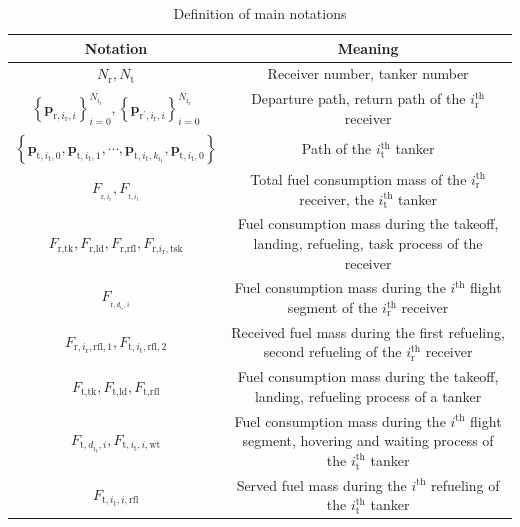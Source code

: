 \begin{table}
	\caption{Definition of main notations}
	
	\begin{centering}
		\begin{tabular}{|c|c|}
			\hline 
			Notation & Meaning\tabularnewline
			\hline 
			${N_\text{r}},{N_\text{t}}$ & Receiver number, tanker number\tabularnewline
			
			$\left\{\mathbf{p}_{\text{r},i_\text{r},i}\right\}_{i=0}^{N_{i_\text{r}}},\left\{\mathbf{p}_{\text{r}^{\prime},i_\text{r},i}\right\}_{i=0}^{N_{i_\text{r}}}$ & Departure path, return path of the $i_{\text{r}}^{\text{th}}$ receiver\tabularnewline
			
			$\left\{\mathbf{p}_{\text{t},i_{\text{t}},0},\mathbf{p}_{\text{t},i_{\text{t}},1},\cdots,\mathbf{p}_{\text{t},i_{\text{t}},k_{i_\text{t}}},\mathbf{p}_{\text{t},i_{\text{t}},0}\right\}$& Path of the $i_{\text{t}}^{\text{th}}$ tanker\tabularnewline
			
			$F_{_{\text{r},i_{\text{r}}}},F_{_{\text{t},i_{\text{t}}}}$ & Total fuel consumption mass of the $i_{\text{r}}^{\text{th}}$ receiver, the $i_{\text{t}}^{\text{th}}$ tanker\tabularnewline
			
			$F_{\text{r,tk}},F_{\text{r,ld}},F_{\text{r,rfl}},F_{\text{r,}i_\text{r},\text{tsk}}$ & Fuel consumption mass during the takeoff, landing, refueling, task process of the receiver\tabularnewline
			
			$F_{_{\text{r},d_{i_\text{r}},i}}$ & Fuel consumption mass during the $i_{}^{\text{th}}$ flight segment of the $i_{\text{r}}^{\text{th}}$ receiver\tabularnewline
			
			$F_{\text{r},i_{\text{r}},\text{rfl},1},F_{\text{t},i_{\text{t}},\text{rfl},2}$ & Received fuel mass during the first refueling, second refueling of the $i_{\text{r}}^{\text{th}}$ receiver\tabularnewline
			
			$F_{\text{t,tk}},F_{\text{t,ld}},F_{\text{t,rfl}}$ & Fuel consumption mass during the takeoff, landing, refueling process of a tanker\tabularnewline
			
			$F_{\text{t},d_{i_\text{t}},i},F_{\text{t},i_\text{t},{i},\text{wt}}$ & Fuel consumption mass during the $i_{}^{\text{th}}$ flight segment, hovering and waiting process of the $i_{\text{t}}^{\text{th}}$ tanker\tabularnewline
			
			$F_{\text{t},i_{\text{t}},i,\text{rfl}}$ & Served fuel mass during the $i_{}^{\text{th}}$ refueling of the $i_{\text{t}}^{\text{th}}$ tanker\tabularnewline
			

\end{tabular}
\end{centering}
\end{table}
